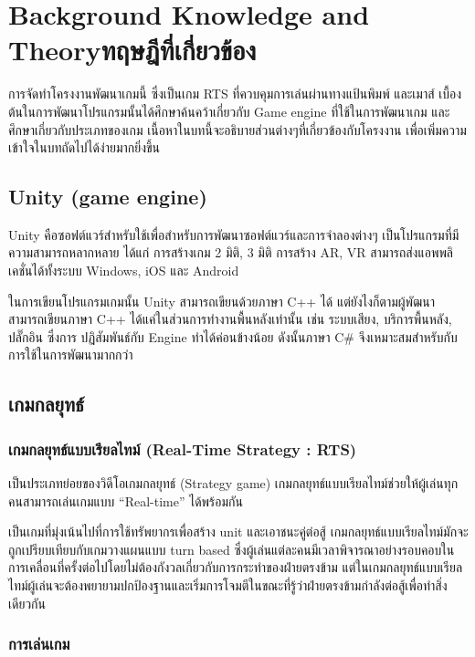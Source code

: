 \chapter{\ifenglish Background Knowledge and Theory\else ทฤษฎีที่เกี่ยวข้อง\fi}

\quad การจัดทําโครงงานพัฒนาเกมนี้ ซึ่งเป็นเกม RTS ที่ควบคุมการเล่นผ่านทางแป้นพิมพ์ และเมาส์ เบื้องต้นในการพัฒนาโปรแกรมนั้นได้ศึกษาค้นคว้าเกี่ยวกับ Game engine ที่ใช้ในการพัฒนาเกม 
และศึกษาเกี่ยวกับประเภทของเกม เนื้อหาในบทนี้จะอธิบายส่วนต่างๆที่เกี่ยวข้องกับโครงงาน เพื่อเพิ่มความเข้าใจในบทถัดไปได้ง่ายมากยิ่งขึ้น

\section{Unity (game engine)}

\qquad Unity คือซอฟต์แวร์สําหรับใช้เพื่อสําหรับการพัฒนาซอฟต์แวร์และการจําลองต่างๆ เป็นโปรแกรมที่มีความสามารถหลากหลาย ได้แก่ การสร้างเกม 2 มิติ, 3 มิติ การสร้าง AR, VR 
สามารถส่งแอพพลิเคชั่นได้ทั้งระบบ Windows, iOS และ Android

\enskip ในการเขียนโปรแกรมเกมนั้น Unity สามารถเขียนด้วยภาษา C++ ได้ แต่ยังไงก็ตามผู้พัฒนาสามารถเขียนภาษา C++ ได้แค่ในส่วนการทํางานพื้นหลังเท่านั้น เช่น ระบบเสียง, บริการพื้นหลัง, ปลั๊กอิน ซึ่งการ
ปฏิสัมพันธ์กับ Engine ทําได้ค่อนข้างน้อย ดังนั้นภาษา C\# จึงเหมาะสมสําหรับกับการใช้ในการพัฒนามากกว่า


\section{เกมกลยุทธ์}
\subsection{เกมกลยุทธ์แบบเรียลไทม์ (Real-Time Strategy : RTS)}

\qquad เป็นประเภทย่อยของวิดีโอเกมกลยุทธ์ (Strategy game) เกมกลยุทธ์แบบเรียลไทม์ช่วยให้ผู้เล่นทุกคนสามารถเล่นเกมแบบ “Real-time” ได้พร้อมกัน

\enskip เป็นเกมที่มุ่งเน้นไปที่การใช้ทรัพยากรเพื่อสร้าง unit และเอาชนะคู่ต่อสู้ เกมกลยุทธ์แบบเรียลไทม์มักจะถูกเปรียบเทียบกับเกมวางแผนแบบ turn based ซึ่งผู้เล่นแต่ละคนมีเวลาพิจารณาอย่างรอบคอบในการเคลื่อนที่ครั้งต่อไปโดยไม่ต้องกังวลเกี่ยวกับการกระทําของฝ่ายตรงข้าม 
แต่ในเกมกลยุทธ์แบบเรียลไทม์ผู้เล่นจะต้องพยายามปกป้องฐานและเริ่มการโจมตีในขณะที่รู้ว่าฝ่ายตรงข้ามกําลังต่อสู้เพื่อทําสิ่งเดียวกัน

\subsection{การเล่นเกม}

